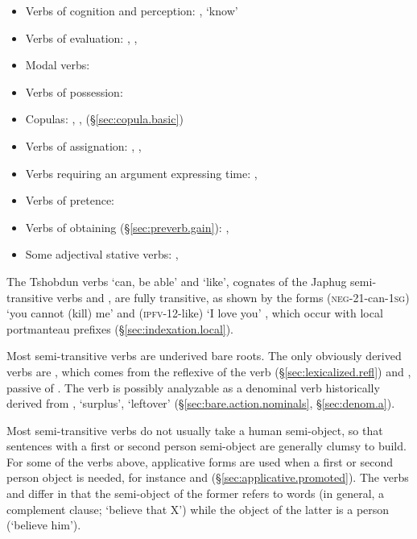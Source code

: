 \begin{itemize}
\item Verbs of cognition and perception: , `know' 
\item Verbs of evaluation: , , 
\item Modal verbs: 
\item Verbs of possession:  
\item Copulas: , ,  (§\ref{sec:copula.basic})
\item Verbs of assignation: , , 
\item Verbs requiring an argument expressing time: , 
\item Verbs of pretence:  
\item Verbs of obtaining (§\ref{sec:preverb.gain}): , 
\item Some adjectival stative verbs: , 
\end{itemize}

The Tshobdun verbs  `can, be able' and  `like', cognates of the Japhug semi-transitive verbs  and , are fully transitive, as shown by the forms  (\textsc{neg}-2\fl{}1-can-\textsc{1sg}) `you cannot (kill) me' \citep[634]{jackson19tshobdun} and   (\textsc{ipfv}-1\fl{}2-like) `I love you' \citep[674]{jackson19tshobdun}, which occur with local portmanteau prefixes (§\ref{sec:indexation.local}).

Most semi-transitive verbs are underived bare roots. The only obviously derived verbs are , which comes from the reflexive of the verb  (§\ref{sec:lexicalized.refl}) and , passive of . The verb  is possibly analyzable as a denominal verb historically derived from , `surplus', `leftover' (§\ref{sec:bare.action.nominals}, §\ref{sec:denom.a}).

Most semi-transitive verbs do not usually take a human semi-object, so that sentences with a first or second person semi-object are generally clumsy to build. For some of the verbs above, applicative forms are used when a first or second person object is needed, for instance  and (§\ref{sec:applicative.promoted}). The verbs  and  differ in that the semi-object of the former refers to words (in general, a complement clause; `believe that X') while the object of the latter is a person (`believe him'). 

